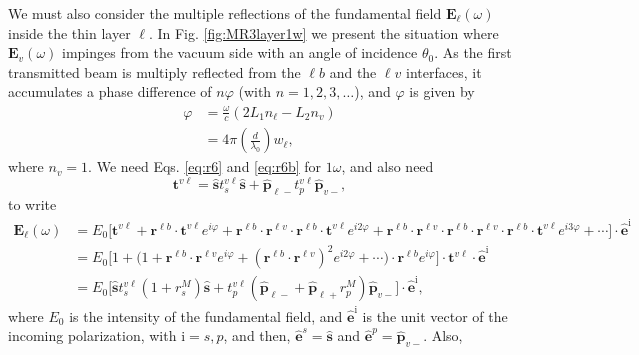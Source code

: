 \documentclass[aps,pra,10pt,amsmath,notitlepage,letterpaper]{revtex4-1}
\begin{document}
We must also consider the multiple reflections of the fundamental field
$\mathbf{E}_{\ell}(\omega)$ inside the thin layer $\ell$. In Fig.
\ref{fig:MR3layer1w} we present the situation where $\mathbf{E}_{v}(\omega)$
impinges from the vacuum side with an angle of incidence $\theta_{0}$. As the
first transmitted beam is multiply reflected from the $\ell b$ and the $\ell v$
interfaces, it accumulates a phase difference of $n\varphi$ (with
$n=1,2,3,\ldots$), and $\varphi$ is given by
\begin{equation}\label{mphi}
\begin{split}
\varphi &= \frac{\omega}{c}(2L_{1}n_{\ell} - L_{2}n_{v})\\
&= 4\pi\left(\frac{d}{\lambda_{0}}\right)w_{\ell},
\end{split}
\end{equation}
where $n_{v}=1$. We need Eqs. \eqref{eq:r6} and \eqref{eq:r6b} for $1\omega$, and
also need
\begin{equation}\label{eq:mvv}
\mathbf{t}^{v\ell}
= \hat{\mathbf{s}}t_{s}^{v\ell}\hat{\mathbf{s}} 
+ \hat{\mathbf{p}}_{\ell -}t_{p}^{v\ell}\hat{\mathbf{p}}_{v-},
\end{equation}
to write
\begin{align}\label{eq:mcvew}
\mathbf{E}_{\ell}(\omega)
&= E_{0}
\Big[
\mathbf{t}^{v\ell} + \mathbf{r}^{\ell b}\cdot\mathbf{t}^{v\ell}e^{i\varphi}
 + \mathbf{r}^{\ell b}\cdot\mathbf{r}^{\ell v}\cdot
   \mathbf{r}^{\ell b}\cdot\mathbf{t}^{v\ell} e^{i2\varphi}
 + \mathbf{r}^{\ell b}\cdot\mathbf{r}^{\ell v}\cdot
   \mathbf{r}^{\ell b}\cdot\mathbf{r}^{\ell v}\cdot
   \mathbf{r}^{\ell b}\cdot\mathbf{t}^{v\ell} e^{i3\varphi}
 + \cdots
\Big]\cdot\hat{\mathbf{e}}^{\mathrm{i}}\nonumber\\
&= E_{0}
\Big[
1 + \Big(1 + \mathbf{r}^{\ell b}\cdot\mathbf{r}^{\ell v}e^{i\varphi}
+ (\mathbf{r}^{\ell b}\cdot\mathbf{r}^{\ell v})^2e^{i2\varphi}+\cdots\Big)\cdot
\mathbf{r}^{\ell b}e^{i\varphi}
\Big]
\cdot\mathbf{t}^{v\ell}\cdot\hat{\mathbf{e}}^{\mathrm{i}}\nonumber\\
&= E_{0}
\Big[
\hat{\mathbf{s}} t^{v\ell}_{s}(1+r^{M}_{s})\hat{\mathbf{s}} 
+ t^{v\ell}_{p}
\left(\hat{\mathbf{p}}_{\ell-}+\hat{\mathbf{p}}_{\ell+}r^{M}_{p}\right)
\hat{\mathbf{p}}_{v-}
\Big]\cdot\hat{\mathbf{e}}^{\mathrm{i}},
\end{align}
where $E_{0}$ is the intensity of the fundamental field, and
$\hat{\mathbf{e}}^{\mathrm{i}}$ is the unit vector of the incoming polarization,
with $\mathrm{i} = s,p$, and then, $\hat{\mathbf{e}}^{s}=\hat{\mathbf{s}}$ and
$\hat{\mathbf{e}}^{p}=\hat{\mathbf{p}}_{v-}$. Also,
\end{document}
